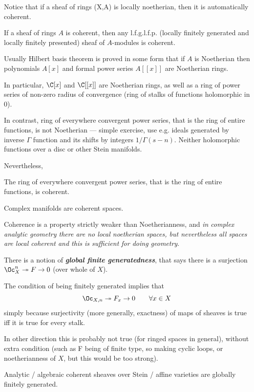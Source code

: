Notice that if a sheaf of rings (X,A) is locally noetherian, then  it is automatically coherent.
\begin{prop}
	If a sheaf of rings $A$ is coherent, then any l.f.g.l.f.p. (locally finitely generated and locally finitely presented) sheaf of $A$-modules is coherent.
\end{prop}
\begin{remark}
	Usually Hilbert basis theorem is proved in some form that if $A$ is Noetherian then polynomials $A[x]$ and formal power series $A[[x]]$ are Noetherian rings.
	
	In particular, $\C[x]$ and $\C[[x]]$ are Noetherian rings, as well as a ring of power series of non-zero radius of convergence (ring of stalks of functions holomorphic in 0).
\end{remark}
\begin{exercise}
	In contrast, ring of everywhere convergent power series, that is the ring of entire functions, is not Noetherian — simple exercise, use e.g. ideals generated by inverse $\Gamma$ function and its shifts by integers $1/\Gamma(s-n)$. Neither holomorphic functions over a disc or other Stein manifolds.
\end{exercise}
Nevertheless, 
\begin{thm}
	The ring of everywhere convergent power series, that is the ring of entire functions, is coherent.
\end{thm}
\begin{coro}
	Complex manifolds are coherent spaces.
\end{coro}
Coherence is a property strictly weaker than Noetherianness, and \textit{in complex analytic geometry there are no local noetherian spaces, but nevertheless all spaces are local coherent and this is sufficient for doing geometry}.

\begin{defn}
	There is a notion of \textbf{\textit{global finite generatedness}}, that says there is a surjection $\Oc_X^n \twoheadrightarrow F \to 0$ (over whole of $X$).
\end{defn}
\begin{remark}
	The condition of being finitely generated implies that
	\[\Oc_{X,n}\twoheadrightarrow F_x\to 0\qquad\forall x\in X\]
	simply because surjectivity (more generally, exactness) of maps of sheaves is true iff it is true for every stalk.
	
	In other direction this is probably not true (for ringed spaces in general), without extra condition (such as F being of finite type, so making cyclic loops, or noetherianness of $X$, but this would be too strong).
\end{remark}
\begin{thm}
	Analytic / algebraic coherent sheaves over Stein / affine varieties are globally finitely generated.
\end{thm}

